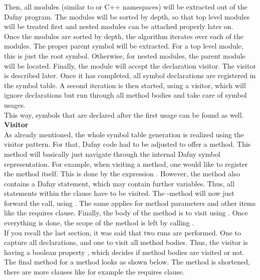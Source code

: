 Then, all modules (similar to \CsharpWithSpace or C++ namespaces) will be extracted out of the Dafny program.
The modules will be sorted by depth, so that top level modules will be treated first and nested modules can be attached properly later on.\\

Once the modules are sorted by depth, the algorithm iterates over each of the modules.
The proper parent symbol will be extracted.
For a top level module, this is just the root symbol.
Otherwise, for nested modules, the parent module will be located.
Finally, the module will accept the declaration visitor.
The visitor is described later.
Once it has completed, all symbol declarations are registered in the symbol table.
A second iteration is then started, using a visitor, which will ignore declarations but run through all method bodies and take care of symbol usages.\\
This way, symbols that are declared after the first usage can be found as well.\\

\textbf{Visitor}\\
As already mentioned, the whole symbol table generation is realized using the visitor pattern.
For that, Dafny code had to be adjusted to offer a  method.
This method will basically just navigate through the internal Dafny symbol representation.
For example, when visiting a method, one would like to register the method itself.
This is done by the expression .
However, the method also contains a Dafny  statement, which may contain further variables.
Thus, all statements within the  clause have to be visited.
The -method will now just forward the call, using .
The same applies for method parameters and other items like the requires clause.
Finally, the body of the method is to visit using .
Once everything is done, the scope of the method is left by calling .\\

If you recall the last section, it was said that two runs are performed.
One to capture all declarations, and one to visit all method bodies.
Thus, the visitor is having a boolean property , which decides if method bodies are visited or not.
The final  method for a method looks as shown below.
The method is shortened, there are more clauses like for example the requires clause.


